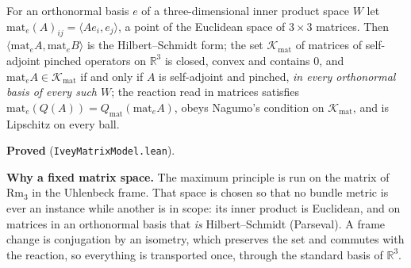 \begin{lemma}
  \label{lem:ivey-matrix-model}
  \leanok
  For an orthonormal basis $e$ of a three-dimensional inner product space $W$ let
  $\mathrm{mat}_e(A)_{ij} = \langle A e_i, e_j\rangle$, a point of the Euclidean space of
  $3\times 3$ matrices. Then $\langle \mathrm{mat}_e A, \mathrm{mat}_e B\rangle$ is the
  Hilbert--Schmidt form; the set $\mathcal{K}_{\mathrm{mat}}$ of matrices of self-adjoint pinched
  operators on $\mathbb{R}^3$ is closed, convex and contains $0$, and
  $\mathrm{mat}_e A \in \mathcal{K}_{\mathrm{mat}}$ if and only if $A$ is self-adjoint and pinched,
  \emph{in every orthonormal basis of every such $W$}; the reaction read in matrices satisfies
  $\mathrm{mat}_e(Q(A)) = Q_{\mathrm{mat}}(\mathrm{mat}_e A)$, obeys Nagumo's condition on
  $\mathcal{K}_{\mathrm{mat}}$, and is Lipschitz on every ball.

  \textbf{Proved} (\texttt{IveyMatrixModel.lean}).

  \textbf{Why a fixed matrix space.} The maximum principle is run on the matrix of
  $\mathrm{Rm}_3$ in the Uhlenbeck frame. That space is chosen so that no bundle metric is ever an
  instance while another is in scope: its inner product is Euclidean, and on matrices in an
  orthonormal basis that \emph{is} Hilbert--Schmidt (Parseval). A frame change is conjugation
  by an isometry, which preserves the set and commutes with the reaction, so everything is
  transported once, through the standard basis of $\mathbb{R}^3$.
\end{lemma}

